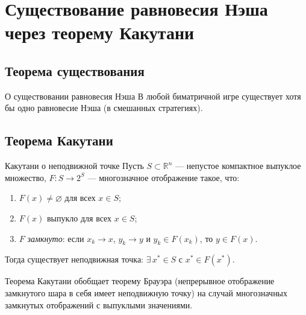 
\section{Существование равновесия Нэша через теорему Какутани}


\subsection{Теорема существования}

\begin{Theorem}{О существовании равновесия Нэша}{}
	В любой биматричной игре существует хотя бы одно равновесие Нэша (в смешанных стратегиях).
\end{Theorem}

\subsection{Теорема Какутани}

\begin{Theorem}{Какутани о неподвижной точке}{}
	Пусть $S\subset\mathbb{R}^n$ — непустое компактное выпуклое множество, $F\colon S\to 2^S$ — многозначное отображение такое, что:
	\begin{enumerate}
		\item $F(x)\ne\varnothing$ для всех $x\in S$;
		\item $F(x)$ выпукло для всех $x\in S$;
		\item $F$ \emph{замкнуто}: если $x_k\to x$, $y_k\to y$ и $y_k\in F(x_k)$, то $y\in F(x)$.
	\end{enumerate}
	Тогда существует неподвижная точка: $\exists\,x^*\in S$ с $x^*\in F(x^*)$.
\end{Theorem}

\begin{Remark}{}{}
	Теорема Какутани обобщает теорему Брауэра (непрерывное отображение замкнутого шара в себя имеет неподвижную точку) на случай многозначных замкнутых отображений с выпуклыми значениями.
\end{Remark}

